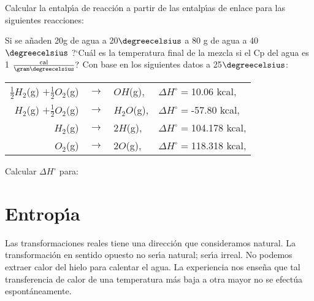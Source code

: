 \begin{exercises}
\exer Calcular la entalp\'{\i}a de reacci\'on a partir de las entalp\'{\i}as de enlace para las siguientes reacciones:
\subexer {}

\subexer {}

\subexer{}

\exer Si se a\~naden 20g de agua a 20$\degreecelsius$ a 80 g de agua a 40 $\degreecelsius$ ?`Cu\'al es la temperatura final de la mezcla si el Cp del agua es 1 $\frac{\textrm{cal}}{\gram\degreecelsius}?$
\exer Con base en los siguientes datos a 25$\degreecelsius$:

{\centering
\vskip6pt
\begin{tabular}{rcll} 
$\frac{1}{2}H_2${\footnotesize (g)}
$+\frac{1}{2}O_2${\footnotesize (g)}  &
$\longrightarrow$ &
$OH${\footnotesize (g)},&
$\Delta H^\circ = $10.06 kcal,\\
$H_2${\footnotesize (g)}
$+\frac{1}{2}O_2${\footnotesize (g)} &
$\longrightarrow$ &
$H_2O${\footnotesize (g)},&
$\Delta H^\circ = $-57.80 kcal,\\ 
$ H_2${\footnotesize (g)} &
$\longrightarrow$ &
$2H${\footnotesize (g)},&
$\Delta H^\circ = $104.178 kcal,\\
$ O_2${\footnotesize (g)} &
$\longrightarrow$ &
$2O${\footnotesize (g)},&
$\Delta H^\circ = $118.318 kcal,\\
\end{tabular}
\vskip6pt
}
Calcular $\Delta H^\circ$ para:
\subexer {}
\subexer {}
\subexer {}
\end{exercises}


\section{Entrop\'{\i}a}

Las transformaciones reales tiene una direcci\'on que consideramos natural. La transformaci\'on en sentido opuesto no ser\'{\i}a natural; ser\'{\i}a irreal. No podemos extraer calor del hielo para calentar el agua. La experiencia nos ense\~na  que tal transferencia de calor de una temperatura m\'as baja a otra mayor no se efect\'ua espont\'aneamente.

